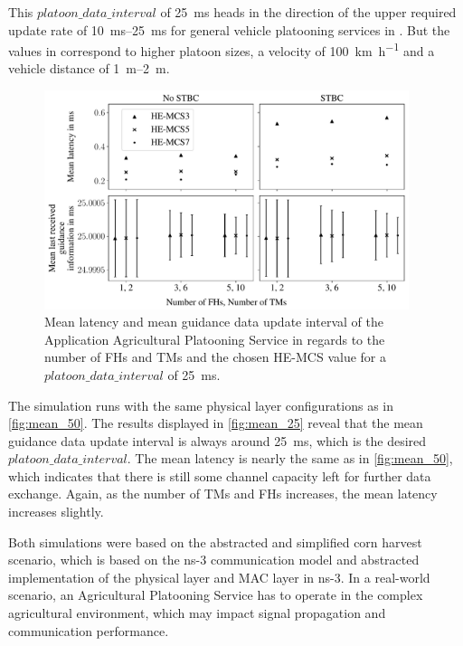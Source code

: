 This $platoon\_data\_interval$ of \SI{25}{\milli\second} heads in the direction of the upper required update rate of \SIrange{10}{25}{\milli\second} for general
vehicle platooning services in \cite{TR-22.886}.
But the values in \cite{TR-22.886} correspond to higher platoon sizes, a velocity of \SI{100}{\kilo\meter\per\hour} and a
vehicle distance of \SIrange{1}{2}{\metre}.


\begin{figure}[]%
   \centering
   \includegraphics[width=0.95\textwidth]{figures/latency_lastUpdate25ms}
   \caption{Mean latency and mean guidance data update interval of the Application Agricultural Platooning Service in
   regards to the number of \acfp{FH} and \acfp{TM} and
   the chosen \ac{HE}-\ac{MCS} value for a $platoon\_data\_interval$ of \SI{25}{\milli\second}.}
   \label{fig:mean_25}%
\end{figure}

The simulation runs with the same physical layer configurations as in \autoref{fig:mean_50}.
The results displayed in \autoref{fig:mean_25} reveal that the mean guidance data update interval is always around \SI{25}{\milli\second},
which is the desired $platoon\_data\_interval$.
The mean latency is nearly the same as in \autoref{fig:mean_50}, which indicates that there is still some channel capacity left for
further data exchange.
Again, as the number of \acp{TM} and \acp{FH} increases, the mean latency increases slightly.

Both simulations were based on the abstracted and simplified corn harvest scenario, which is based on the ns-3 communication model and
abstracted implementation of the physical layer and MAC layer in ns-3.
In a real-world scenario, an Agricultural Platooning Service has to operate in the complex agricultural environment, which
may impact signal propagation and communication performance.

